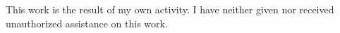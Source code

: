 \documentclass[12pt]{report}
\begin{document}
\vspace{1em}
\noindent
This work is the result of my own activity. I have neither given nor received unauthorized assistance on this work.


\tableofcontents


\newpage
{}











\end{document}
